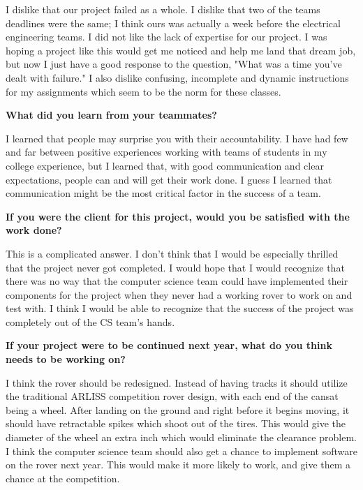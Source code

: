 \documentclass[10pt,letterpaper,onecolumn,draftclsnofoot,journal]{IEEEtran}
\begin{document}
\par
I dislike that our project failed as a whole. I dislike that two of the teams deadlines were the same; I think ours was actually a week before the electrical engineering teams. I did not like the lack of expertise for our project. I was hoping a project like this would get me noticed and help me land that dream job, but now I just have a good response to the question, "What was a time you've dealt with failure." I also dislike confusing, incomplete and dynamic instructions for my assignments which seem to be the norm for these classes.\vspace{.3cm}
\par
\textbf{What did you learn from your teammates?}\vspace{.3cm}
\par
I learned that people may surprise you with their accountability. I have had few and far between positive experiences working with teams of students in my college experience, but I learned that, with good communication and clear expectations, people can and will get their work done. I guess I learned that communication might be the most critical factor in the success of a team.\vspace{.3cm}
\par
\textbf{If you were the client for this project, would you be satisfied with the work done?}\vspace{.3cm}
\par
This is a complicated answer. I don't think that I would be especially thrilled that the project never got completed. I would hope that I would recognize that there was no way that the computer science team could have implemented their components for the project when they never had a working rover to work on and test with. I think I would be able to recognize that the success of the project was completely out of the CS team's hands.\vspace{.3cm}
\par
\textbf{If your project were to be continued next year, what do you think needs to be working on?}\vspace{.3cm}
\par
I think the rover should be redesigned. Instead of having tracks it should utilize the traditional ARLISS competition rover design, with each end of the cansat being a wheel. After landing on the ground and right before it begins moving, it should have retractable spikes which shoot out of the tires. This would give the diameter of the wheel an extra inch which would eliminate the clearance problem. I think the computer science team should also get a chance to implement software on the rover next year. This would make it more likely to work, and give them a chance at the competition.
\end{document}
